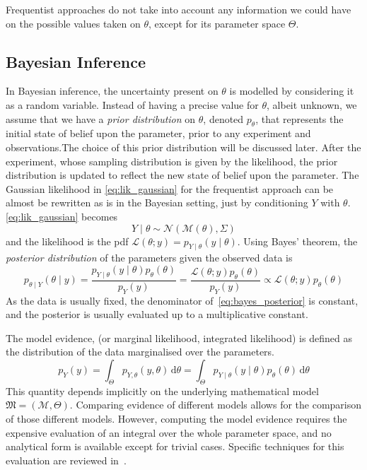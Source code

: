 \documentclass[../../Main_ManuscritThese.tex]{subfiles}
\begin{document}
  Frequentist approaches do not take into account any information we could have on the possible values taken on $\theta$, except for its parameter space $\Theta$.
\subsection{Bayesian Inference}
\label{sec:bayesian_inference_MAP}
In Bayesian inference, the uncertainty present on $\theta$ is modelled by considering it as a random variable. Instead of having a precise value for $\theta$, albeit unknown, we assume that we have a \emph{prior distribution} on $\theta$, denoted $p_{\theta}$, that represents the initial state of belief upon the parameter, prior to any experiment and observations.The choice of this prior distribution will be discussed later.
After the experiment, whose sampling distribution is given by the likelihood, the prior distribution is updated to reflect the new state of belief upon the parameter. 
The Gaussian likelihood in \cref{eq:lik_gaussian} for the frequentist approach can be almost be rewritten as is in the Bayesian setting, just by conditioning $Y$ with $\theta$.
\cref{eq:lik_gaussian} becomes
\begin{equation}
  Y \mid  \theta \sim \mathcal{N}(\mathcal{M}(\theta), \Sigma)
\end{equation}
and the likelihood is the pdf $\mathcal{L}(\theta;y) = p_{Y\mid \theta}(y \mid  \theta)$.
Using Bayes' theorem, the \emph{posterior distribution} of the parameters given the observed data is
\begin{equation}
  \label{eq:bayes_posterior}
  p_{\theta \mid Y}(\theta \mid y) = \frac{p_{Y\mid \theta}(y \mid  \theta)p_{\theta}(\theta)}{p_Y(y)} = \frac{\mathcal{L}(\theta;y)p_{\theta}(\theta)}{p_Y(y)} \propto \mathcal{L}(\theta;y)p_{\theta}(\theta)
\end{equation}
As the data is usually fixed, the denominator of~\eqref{eq:bayes_posterior} is constant, and the posterior is usually evaluated up to a multiplicative constant.


\begin{definition}
  \label{def:model_evidence}
  The model evidence, (or marginal likelihood, integrated likelihood) is defined as the distribution of the data marginalised over the parameters.
  \begin{equation}
    \label{eq:model_evidence}
    p_Y(y) = \int_{\Theta}p_{Y,\theta}(y,\theta)\,\mathrm{d}\theta = \int_{\Theta}p_{Y \mid \theta}(y \mid \theta)p_{\theta}(\theta)\,\mathrm{d}\theta
  \end{equation}
  This quantity depends implicitly on the underlying mathematical model $\mathfrak{M} = (\mathcal{M},\Theta)$. Comparing evidence of different models allows for the comparison of those different models. However, computing the model evidence requires the expensive evaluation of an integral over the whole parameter space, and no analytical form is available except for trivial cases. Specific techniques for this evaluation are reviewed in~\cite{friel_estimating_2011}.
\end{definition}
\end{document}
